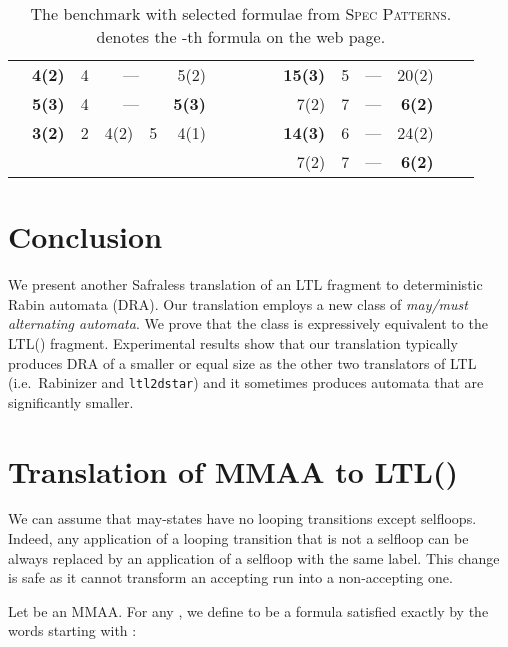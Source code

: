 \documentclass{llncs}
\begin{document}
\begin{table}[t!]
\begin{tabular}{|c||r c|rc|r|c|c||rc|rc|r|}
 & \textbf{4(2)}& 4 & \multicolumn{2}{|c|}{---}  & 5(2) ~~~&&   & \textbf{15(3)}& 5 & \multicolumn{2}{|c|}{---}  & 20(2)~~~~\\  
 & \textbf{5(3)}& 4 & \multicolumn{2}{|c|}{---}  & \textbf{5(3)} ~~~&&   & 7(2)& 7 & \multicolumn{2}{|c|}{---} & \textbf{6(2)}~~~~\\  
 & \textbf{3(2)}& 2 & 4(2) & 5 & 4(1) ~~~&&   & \textbf{14(3)}& 6 & \multicolumn{2}{|c|}{---}  & 24(2)~~~~\\  
\cline{1-6}
\multicolumn{7}{c|}{}& & 7(2)& 7 & \multicolumn{2}{|c|}{---}  & \textbf{6(2)}~~~~\\  
\cline{8-13}
\end{tabular}
\caption{The benchmark with selected formulae from \textsc{Spec
    Patterns}.  denotes the -th formula on the web page.}
\label{tab:SPEC}
\end{table}





\section{Conclusion}\label{sec:concl}
We present another Safraless translation of an LTL fragment to deterministic
Rabin automata (DRA).  Our translation employs a new class of \emph{may/must
  alternating automata}.  We prove that the class is expressively equivalent
to the LTL() fragment.  Experimental results show that our
translation typically produces DRA of a smaller or equal size as the other
two translators of LTL (i.e.~Rabinizer and \texttt{ltl2dstar}) and it
sometimes produces automata that are significantly smaller.








\newpage
\appendix



\section{Translation of MMAA to LTL()}\label{sec:mmaa2ltl}
We can assume that may-states have no looping transitions except
selfloops. Indeed, any application of a looping transition that is not a
selfloop can be always replaced by an application of a selfloop with the
same label. This change is safe as it cannot transform an accepting run into
a non-accepting one.

Let  be an MMAA. For any , we 
define  to be a formula satisfied exactly by the words starting 
with :
 
\end{document}
